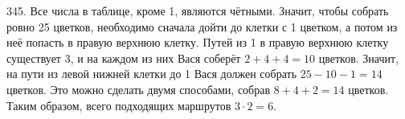 345. Все числа в таблице, кроме 1, являются чётными. Значит, чтобы собрать ровно 25 цветков, необходимо сначала дойти до клетки с 1 цветком, а потом из неё попасть в правую верхнюю клетку. Путей из 1 в правую верхнюю клетку существует 3, и на каждом из них Вася соберёт $2+4+4=10$ цветков. Значит, на пути из левой нижней клетки до 1 Вася должен собрать $25-10-1=14$ цветков. Это можно сделать двумя способами, собрав $8+4+2=14$ цветков. Таким образом, всего подходящих маршрутов $3\cdot2=6.$\\
